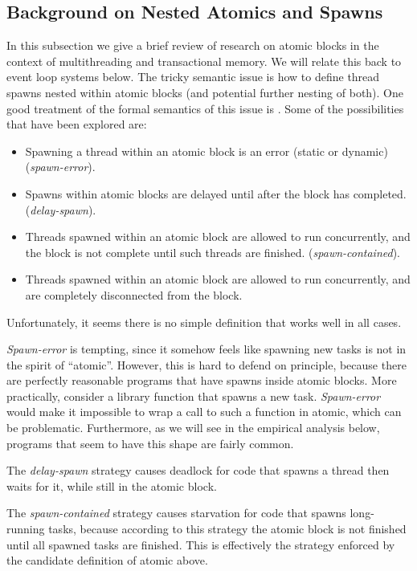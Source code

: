 \documentclass[acmsmall,anonymous,review]{acmart}\settopmatter{printfolios=true,printccs=false,printacmref=false}
\begin{document}
\subsection{Background on Nested Atomics and Spawns}

In this subsection we give a brief review of research on atomic blocks in the context of multithreading and transactional memory.
We will relate this back to event loop systems below.
The tricky semantic issue is how to define thread spawns nested within atomic blocks (and potential further nesting of both).
One good treatment of the formal semantics of this issue is \cite{Moore2008}.
Some of the possibilities that have been explored are:
\begin{itemize}
\item Spawning a thread within an atomic block is an error (static or dynamic) (\emph{spawn-error}).
\item Spawns within atomic blocks are delayed until after the block has completed. (\emph{delay-spawn}).
\item Threads spawned within an atomic block are allowed to run concurrently, and the block is not complete until such threads are finished. (\emph{spawn-contained}).
\item Threads spawned within an atomic block are allowed to run concurrently, and are completely disconnected from the block.
\end{itemize}

Unfortunately, it seems there is no simple definition that works well in all cases.

\emph{Spawn-error} is tempting, since it somehow feels like spawning new tasks is not in the spirit of ``atomic''.
However, this is hard to defend on principle, because there are perfectly reasonable programs that have spawns inside atomic blocks.
More practically, consider a library function that spawns a new task.
\emph{Spawn-error} would make it impossible to wrap a call to such a function in atomic, which can be problematic.
Furthermore, as we will see in the empirical analysis below, programs that seem to have this shape are fairly common.

The \emph{delay-spawn} strategy causes deadlock for code that spawns a thread then waits for it, while still in the atomic block.

The \emph{spawn-contained} strategy causes starvation for code that spawns long-running tasks, because according to this strategy the atomic block is not finished until all spawned tasks are finished.
This is effectively the strategy enforced by the candidate definition of atomic above.
\end{document}
